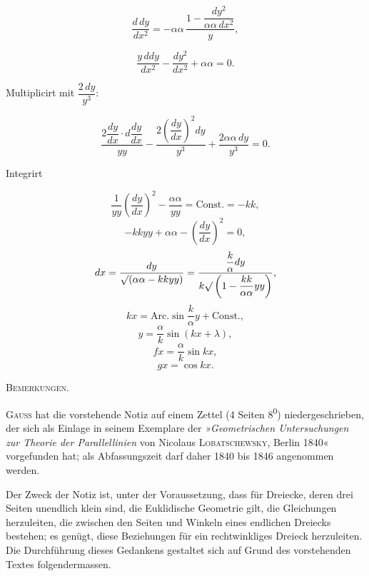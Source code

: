 %
\[
\frac{d\,dy}{dx^{2}} = -\alpha\alpha\,\frac{1-\dfrac{dy^{2}}{\alpha\alpha\,dx^{2}}}{y},
\]

\[
\frac{y\,ddy}{dx^{2}} - \frac{dy^{2}}{dx^{2}} + \alpha\alpha = 0.
\]

\noindent Multiplicirt mit $\dfrac{2\,dy}{y^{3}}$:

\[
\frac{2\dfrac{dy}{dx}\cdot d\dfrac{dy}{dx}}{yy} - \frac{2\left(\dfrac{dy}{dx}\right)^{2}dy}{y^{3}} + \frac{2\alpha\alpha\,dy}{y^{3}} = 0.
\]

\noindent Integrirt

\[
\frac{1}{yy}\left(\frac{dy}{dx}\right)^{2} - \frac{\alpha\alpha}{yy} = \text{Const.} = -kk,
\]
\[
-kkyy + \alpha\alpha - \left(\frac{dy}{dx}\right)^{2} = 0,
\]
\[
dx = \frac{dy}{\mathord{\surd}(\alpha\alpha-kkyy)} = \frac{\dfrac{k}{\alpha}dy}{k\mathord{\surd}\left(1-\dfrac{kk}{\alpha\alpha}yy\right)},
\]
\[
kx = \text{Arc.}\sin\frac{k}{\alpha}y + \text{Const.},
\]
\[
y = \frac{\alpha}{k}\sin(kx+\lambda),
\]
\[
fx = \frac{\alpha}{k}\sin kx,
\]
\[
gx = \cos kx.
\]

\smallskip
\begin{center}

\end{center}

\begin{center}
\textsc{Bemerkungen.}
\end{center}

\noindent \textsc{Gauss} hat die vorstehende Notiz auf einem Zettel (4 Seiten 8\textsuperscript{0}) niedergeschrieben, der sich als Einlage in seinem Exemplare der \emph{»Geometrischen Untersuchungen zur Theorie der Parallellinien} von Nicolaus \textsc{Lobatschewsky}, Berlin 1840« vorgefunden hat; als Abfassungszeit darf daher 1840 bis 1846 angenommen werden.

Der Zweck der Notiz ist, unter der Voraussetzung, dass f\"ur Dreiecke, deren drei Seiten unendlich klein sind, die Euklidische Geometrie gilt, die Gleichungen herzuleiten, die zwischen den Seiten und Winkeln eines endlichen Dreiecks bestehen; es gen\"ugt, diese Beziehungen f\"ur ein rechtwinkliges Dreieck herzuleiten. Die Durchf\"uhrung dieses Gedankens gestaltet sich auf Grund des vorstehenden Textes folgendermassen.
